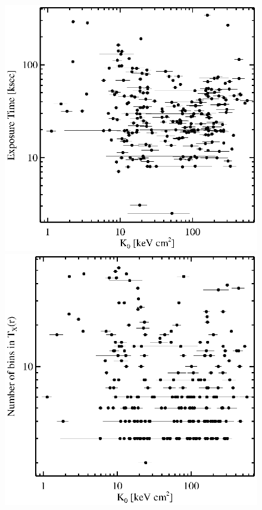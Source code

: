\begin{center}
\begin{figure}[htp]
\begin{minipage}[htp]{0.5\linewidth}
    \end{minipage}
    \begin{minipage}[htp]{0.5\linewidth}
      \includegraphics*[width=\textwidth, trim=28mm 7mm 30mm 17mm, clip]{texpk0.eps}
    \end{minipage}
    \begin{minipage}[htp]{0.5\linewidth}
      \includegraphics*[width=\textwidth, trim=28mm 7mm 30mm 17mm, clip]{ntxbins_k0.eps}

\end{minipage}
\end{figure}
\end{center}
